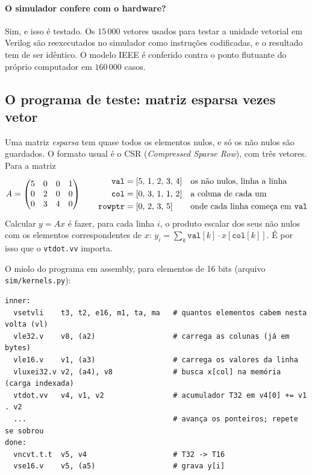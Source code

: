 \documentclass[11pt,a4paper]{article}
\newcommand{\code}[1]{\texttt{#1}}
\begin{document}
\paragraph{O simulador confere com o hardware?} Sim, e isso é testado. Os $15\,000$ vetores usados para
testar a unidade vetorial em Verilog são reexecutados no simulador como instruções codificadas, e o
resultado tem de ser idêntico. O modelo IEEE é conferido contra o ponto flutuante do próprio computador em
$160\,000$ casos.

\subsection{O programa de teste: matriz esparsa vezes vetor}

Uma matriz \emph{esparsa} tem quase todos os elementos nulos, e só os não nulos são guardados. O formato
usual é o CSR (\emph{Compressed Sparse Row}), com três vetores. Para a matriz
\[
A=\begin{pmatrix} 5 & 0 & 0 & 1\\ 0 & 2 & 0 & 0\\ 0 & 3 & 4 & 0 \end{pmatrix}
\qquad
\begin{aligned}
\texttt{val} &= [5,\,1,\,2,\,3,\,4] &&\text{os não nulos, linha a linha}\\
\texttt{col} &= [0,\,3,\,1,\,1,\,2] &&\text{a coluna de cada um}\\
\texttt{rowptr} &= [0,\,2,\,3,\,5] &&\text{onde cada linha começa em \texttt{val}}
\end{aligned}
\]
Calcular $y=Ax$ é fazer, para cada linha $i$, o produto escalar dos seus não nulos com os elementos
correspondentes de $x$: $y_i=\sum_k \texttt{val}[k]\cdot x[\texttt{col}[k]]$. É por isso que o
\code{vtdot.vv} importa.

O miolo do programa em assembly, para elementos de 16 bits (arquivo \code{sim/kernels.py}):

\begin{lstlisting}
inner:
  vsetvli    t3, t2, e16, m1, ta, ma   # quantos elementos cabem nesta volta (vl)
  vle32.v    v8, (a2)                  # carrega as colunas (já em bytes)
  vle16.v    v1, (a3)                  # carrega os valores da linha
  vluxei32.v v2, (a4), v8              # busca x[col] na memória (carga indexada)
  vtdot.vv   v4, v1, v2                # acumulador T32 em v4[0] += v1 . v2
  ...                                  # avança os ponteiros; repete se sobrou
done:
  vncvt.t.t  v5, v4                    # T32 -> T16
  vse16.v    v5, (a5)                  # grava y[i]
\end{lstlisting}
\end{document}

